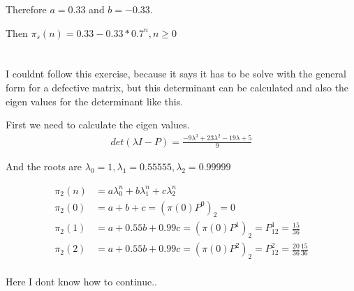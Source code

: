 \documentclass[12pt, a4paper]{article}
\begin{document}
Therefore $a = 0.33$ and $b = -0.33$.

Then $\pi_s(n) = 0.33 - 0.33 * 0.7^n, n \geq 0$

\section{}
I couldnt follow this exercise, because it says it has to be solve with the general form for a defective matrix, but this determinant can be calculated and also the eigen values for the determinant like this.

First we need to calculate the eigen values.
\begin{subequations}
  \begin{align}
    det(\lambda I - P) = \frac{-9\lambda^3+23\lambda^2-19\lambda+5}{9}
  \end{align}
\end{subequations}

And the roots are $\lambda_0 = 1, \lambda_1 = 0.55555, \lambda_2 = 0.99999$

\begin{subequations}
  \begin{align}
    \pi_2(n) &= a \lambda_0^n + b \lambda_1^n + c \lambda_2^n\\
    \pi_2(0) &= a + b + c = (\pi(0)P^0)_2 = 0\\
    \pi_2(1) &= a + 0.55 b + 0.99 c = (\pi(0)P^1)_2 = P_{12}^1 = \frac{15}{36}\\
    \pi_2(2) &= a + 0.55 b + 0.99 c = (\pi(0)P^2)_2 = P_{12}^2 = \frac{20}{36}\frac{15}{36}\\
  \end{align}
\end{subequations}

Here I dont know how to continue..
\end{document}
